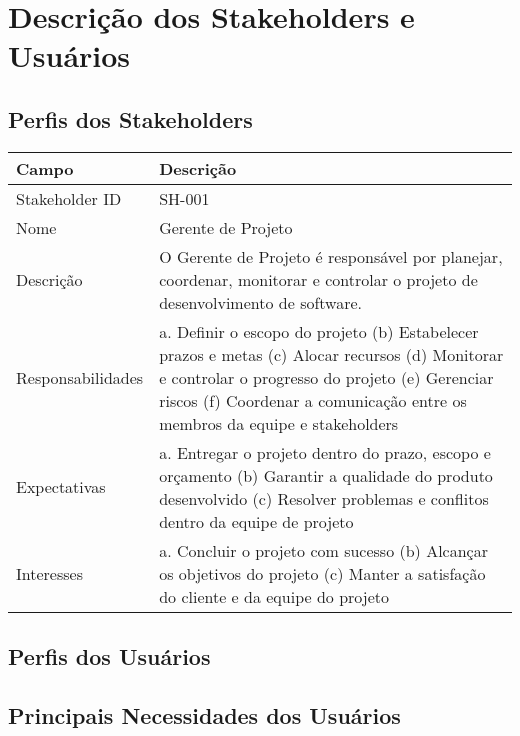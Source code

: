 \chapter{Descrição dos Stakeholders e Usuários}

\section{Perfis dos Stakeholders}

\begin{table}[!ht]
    \centering
    \begin{tabular}{|l|l|}
    \hline
        Campo & Descrição \\ \hline
        Stakeholder ID & SH-001 \\ \hline
        Nome & Gerente de Projeto \\ \hline
        Descrição & O Gerente de Projeto é responsável por planejar, coordenar, monitorar e controlar o projeto de desenvolvimento de software. \\ \hline
        Responsabilidades & a. Definir o escopo do projeto (b) Estabelecer prazos e metas (c) Alocar recursos (d) Monitorar e controlar o progresso do projeto (e) Gerenciar riscos (f) Coordenar a comunicação entre os membros da equipe e stakeholders \\ \hline
        Expectativas & a. Entregar o projeto dentro do prazo, escopo e orçamento (b) Garantir a qualidade do produto desenvolvido (c) Resolver problemas e conflitos dentro da equipe de projeto \\ \hline
        Interesses & a. Concluir o projeto com sucesso (b) Alcançar os objetivos do projeto (c) Manter a satisfação do cliente e da equipe do projeto \\ \hline
    \end{tabular}
\end{table}

\section{Perfis dos Usuários}
\section{Principais Necessidades dos Usuários}

